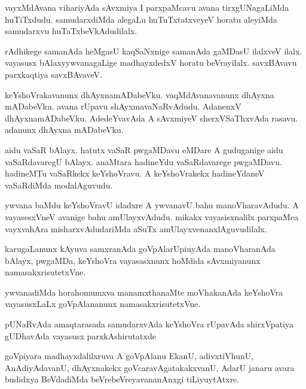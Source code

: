 \documentclass{article}
\begin{document}
\begin{mn}%
vayxMdAvana vihariyAda sAvxmiya I parxpaMcavu avana tirxgUNagaLiMda huTiTxdudu. 
samudarxdiMda alegaLu huTuTxtatxveyeV horatu aleyiMda samudarxvu huTaTxbeVkAdudilalx.
\end{mn}

\begin{mn}%
rAdhikege samanAda heMgasU kaqSaNxnige samanAda gaMDasU ilalxveV ilalx. vayasusx 
bAlaxyywvanagaLige madhayxdedxV horatu beVrayilalx. savxBAvavu parxkaqtiya savxBAvaveV.
\end{mn}

\begin{mn}%
keYshoVrakavanunx dhAyxnamADabeVku. vaqMdAvanavanunx dhAyxna mADabeVku. avana rUpavu 
shAyxmavaNaRvAdudu. AdanenxV dhAyxnamADabeVku. AdedeYvavAda A sAvxmiyeV sherxVSaThxvAda 
rasavu. adanunx dhAyxna mADabeVku.
\end{mn}

\begin{mn}%
aidu vaSaR bAlayx. hatutx vaSaR pwgaMDavu eMDare A guduganige aidu vaSaRdavaregU bAlayx. 
anaMtara hadineYdu vaSaRdavarege pwgaMDavu. hadineMTu vaSaRkekx keYshoVravu. A 
keYshoVrakekx hadineYdaneV vaSaRdiMda modalAguvudu.
\end{mn}

\begin{mn}%
ywvana baMdu keYshoVravU idadxre A ywvanavU bahu manoVharavAdudu. A vayasesxVneV avanige 
bahu amUlayxvAdudu. mikakx vayasisxnalilx parxpaMca vayxvahAra misharxvAdudariMda aSuTx 
amUlayxvenanxlAguvudilalx.
\end{mn}

\begin{mn}%
karugaLanunx kAyuva samxranAda goVpAlarUpiuyAda manoVharanAda bAlayx, pwgaMDa, keYshoVra 
vayasasxnunx hoMdida sAvxmiyanunx namasakxrisutetxVne.
\end{mn}

\begin{mn}%
ywvanadiMda horahomumxva manamxthanaMte moVhakanAda keYshoVra vayasusxLaLx goVpAlananunx 
namasakxrisutetxVne.
\end{mn}

\begin{mn}%
pUNaRvAda amaqtarasada samudarxvAda keYshoVra rUpavAda shirxVpatiya gUDhavAda vayasusx 
parxkAshirutatxde
\end{mn}

\begin{mn}%
goVpiyara madhayxdalilxruva A goVpAlanu EkanU, adivxtiVhunU, AnAdiyAdavanU, dhAyxnakekx 
goVcaravAgatakakxvanU, AdarU janaru avara budidxya BeVdadiMda beVrebeVreyavananAnxgi 
tiLiyuytAtxre.
\end{mn}
\end{document}
